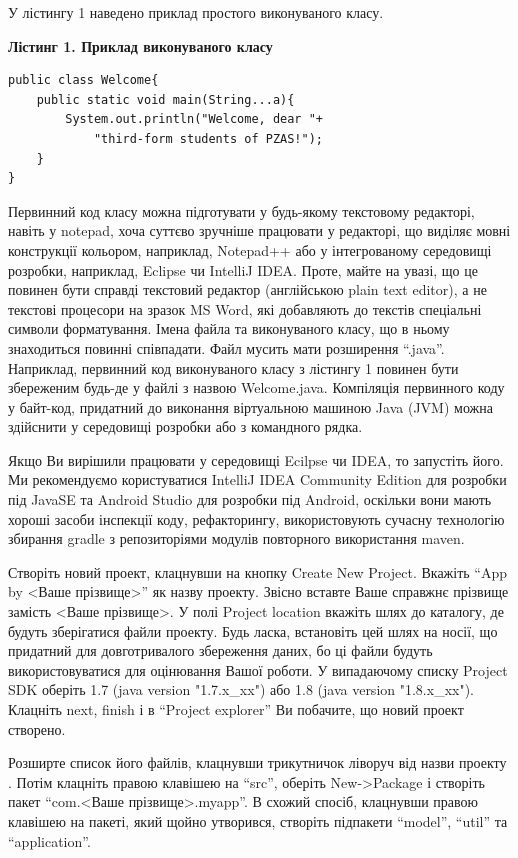 У лістингу 1 наведено приклад простого виконуваного класу.

{\bf Лістинг 1.
Приклад виконуваного класу }
\begin{lstlisting}
public class Welcome{
    public static void main(String...a){
        System.out.println("Welcome, dear "+
            "third-form students of PZAS!");
    }
}
\end{lstlisting}
Первинний код класу можна підготувати у будь-якому текстовому редакторі, навіть у notepad, хоча суттєво зручніше працювати у редакторі, що виділяє мовні конструкції кольором, наприклад, Notepad++ або у інтегрованому середовищі розробки, наприклад, Eclipse чи IntelliJ IDEA. Проте, майте на увазі, що це повинен бути справді текстовий редактор (англійською plain text editor), а не текстові процесори на зразок MS Word, які добавляють до текстів спеціальні символи форматування.
Імена файла та виконуваного класу, що в ньому знаходиться повинні співпадати. Файл мусить мати розширення ``.java''. Наприклад, первинний код виконуваного класу з лістингу 1 повинен бути збереженим будь-де у файлі з назвою Welcome.java. 
Компіляція первинного коду у байт-код, придатний до виконання віртуальною машиною Java (JVM) можна здійснити у середовищі розробки або з командного рядка.

Якщо Ви вирішили працювати у середовищі Ecilpse чи IDEA, то запустіть його. Ми рекомендуємо користуватися IntelliJ IDEA Community Edition для розробки під JavaSE та Android Studio для розробки під Android, оскільки вони мають хороші засоби інспекції коду, рефакторингу, використовують сучасну технологію збирання gradle з репозиторіями модулів повторного використання maven. 

Створіть новий проект, клацнувши на кнопку Create New Project.
Вкажіть ``App by <Ваше прізвище>'' як назву проекту. Звісно вставте Ваше справжнє прізвище замість <Ваше прізвище>. 
У полі Project location вкажіть шлях до каталогу, де будуть зберігатися файли проекту. Будь ласка, встановіть цей шлях на носії, що придатний для довготривалого збереження даних, бо ці файли будуть використовуватися для оцінювання Вашої роботи.
У випадаючому списку Project SDK оберіть 1.7 (java version "1.7.x\_xx") або 1.8 (java version "1.8.x\_xx"). Клацніть next, finish і в ``Project explorer'' Ви побачите, що новий проект створено.
 
Розширте список його файлів, клацнувши трикутничок ліворуч від назви проекту . 
 Потім клацніть правою клавішею на ``src'', оберіть New->Package і створіть пакет ``com.<Ваше прізвище>.myapp''. В схожий спосіб, клацнувши правою клавішею на пакеті, який щойно утворився, створіть підпакети ``model'', ``util'' та ``application''.
 
